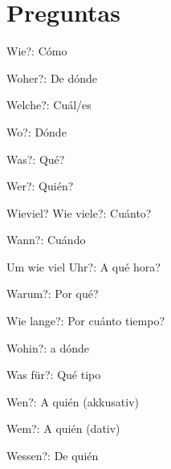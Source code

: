 \section{Preguntas}
\begin{multicols}{2}
\begin{myitemize}
\item Wie?: Cómo
\item Woher?: De dónde
\item Welche?: Cuál/es
\item Wo?: Dónde
\item Was?: Qué?
\item Wer?: Quién?
\item Wieviel? Wie viele?: Cuánto?
\item Wann?: Cuándo
\item Um wie viel Uhr?: A qué hora?
\item Warum?: Por qué?
\item Wie lange?: Por cuánto tiempo?
\item Wohin?: a dónde
\item Was für?: Qué tipo
\item Wen?: A quién (akkusativ)
\item Wem?: A quién (dativ)
\item Wessen?: De quién
\end{myitemize}
\end{multicols}

